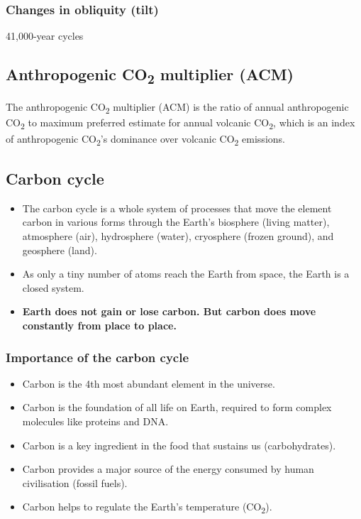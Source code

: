 \documentclass[11pt]{article}
\begin{document}
\subsubsection{Changes in obliquity (tilt)}
\label{sec:org85ba5a4}
41,000-year cycles
\subsection{Anthropogenic CO\textsubscript{2} multiplier (ACM)}
\label{sec:org729b8ed}
The anthropogenic CO\textsubscript{2} multiplier (ACM) is the ratio of annual anthropogenic CO\textsubscript{2} to maximum preferred estimate for annual volcanic CO\textsubscript{2}, which is an index of anthropogenic CO\textsubscript{2}'s dominance over volcanic CO\textsubscript{2} emissions.
\subsection{Carbon cycle}
\label{sec:orgccee11d}
\begin{itemize}
\item The carbon cycle is a whole system of processes that move the element carbon in various forms through the Earth's biosphere (living matter), atmosphere (air), hydrosphere (water), cryosphere (frozen ground), and geosphere (land).
\item As only a tiny number of atoms reach the Earth from space, the Earth is a closed system.
\item \textbf{Earth does not gain or lose carbon. But carbon does move constantly from place to place.}
\end{itemize}

\newpage
\subsubsection{Importance of the carbon cycle}
\label{sec:org34a044e}
\begin{itemize}
\item Carbon is the 4th most abundant element in the universe.
\item Carbon is the foundation of all life on Earth, required to form complex molecules like proteins and DNA.
\item Carbon is a key ingredient in the food that sustains us (carbohydrates).
\item Carbon provides a major source of the energy consumed by human civilisation (fossil fuels).
\item Carbon helps to regulate the Earth's temperature (CO\textsubscript{2}).
\end{itemize}
\end{document}
